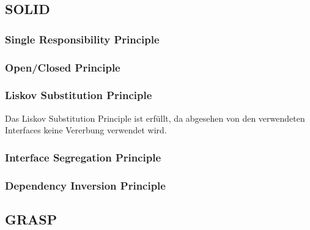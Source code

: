 \subsection{SOLID}
\subsubsection{Single Responsibility Principle}

\subsubsection{Open/Closed Principle}

\subsubsection{Liskov Substitution Principle}
Das Liskov Substitution Principle ist erfüllt, da abgesehen von den verwendeten Interfaces keine Vererbung verwendet wird.
\subsubsection{Interface Segregation Principle}

\subsubsection{Dependency Inversion Principle}

\subsection{GRASP}


